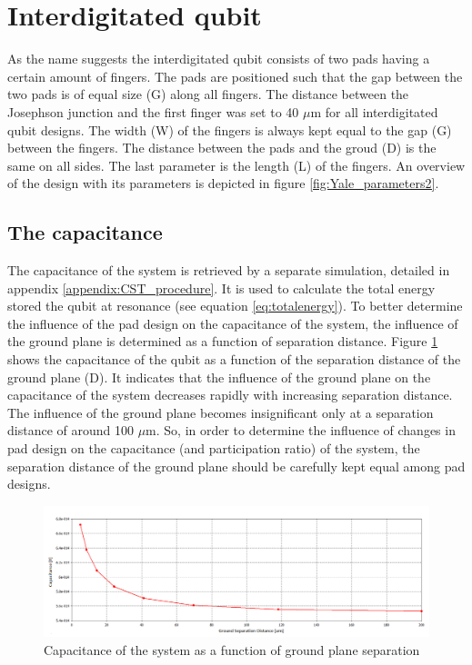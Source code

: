 \clearpage
\section{Interdigitated qubit}
As the name suggests the interdigitated qubit consists of two pads having a certain amount of fingers. The pads are positioned such that the gap between the two pads is of equal size (G) along all fingers. The distance between the Josephson junction and the first finger was set to 40 \(\mu\)m for all interdigitated qubit designs. The width (W) of the fingers is always kept equal to the gap (G) between the fingers. The distance between the pads and the groud (D) is the same on all sides. The last parameter is the length (L) of the fingers. An overview of the design with its parameters is depicted in figure \ref{fig:Yale_parameters2}.

\subsection{The capacitance}
The capacitance of the system is retrieved by a separate simulation, detailed in appendix \ref{appendix:CST_procedure}. It is used to calculate the total energy stored the qubit at resonance (see equation \eqref{eq:totalenergy}).
To better determine the influence of the pad design on the capacitance of the system, the influence of the ground plane is determined as a function of separation distance. Figure \ref{fig:capacitance_vs_slotsize} shows the capacitance of the qubit as a function of the separation distance of the ground plane (D). It indicates that the influence of the ground plane on the capacitance of the system decreases rapidly with increasing separation distance. The influence of the ground plane becomes insignificant only at a separation distance of around 100 \(\mu\)m. So, in order to determine the influence of changes in pad design on the capacitance (and participation ratio) of the system, the separation distance of the ground plane should be carefully kept equal among pad designs.  

\begin{figure}
	\centering
	\includegraphics[width = \textwidth]{Figures/capacitance_vs_slotsize_edit}
	\caption{Capacitance of the system as a function of ground plane separation}
	\label{fig:capacitance_vs_slotsize}
\end{figure}

